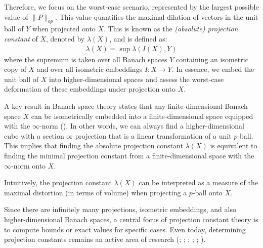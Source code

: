 Therefore, we focus on the worst-case scenario, represented by the largest possible value of $\|P\|_{op}$. This value quantifies the maximal dilation of vectors in the unit ball of $Y$ when projected onto $X$.  This is known as the \emph{(absolute) projection constant} of $X$, denoted by $\lambda(X)$, and is defined as:
\begin{align*}
\lambda(X) = \sup \lambda(I(X), Y)
\end{align*}
where the supremum is taken over all Banach spaces $Y$ containing an isometric copy of $X$ and over all isometric embeddings $I: X \rightarrow Y$. In essence, we embed the unit ball of $X$ into higher-dimensional spaces and assess the worst-case deformation of these embeddings under projection onto $X$.

A key result in Banach space theory states that any finite-dimensional Banach space $X$ can be isometrically embedded into a finite-dimensional space equipped with the $\infty$-norm (\cite{defantProjectionConstantsSpaces2022}). In other words, we can always find a higher-dimensional cube with a section or projection that is a linear transformation of a unit $p$-ball. This implies that finding the absolute projection constant $\lambda(X)$ is equivalent to finding the minimal projection constant from a finite-dimensional space with the $\infty$-norm onto $X$.

Intuitively, the projection constant $\lambda(X)$ can be interpreted as a measure of the maximal distortion (in terms of volume) when projecting a $p$-ball onto $X$.

Since there are infinitely many projections, isometric embeddings, and also higher-dimensional Banach spaces, a central focus of projection constant theory is to compute bounds or exact values for specific cases.  Even today, determining projection constants remains an active area of research (\cite{deregowskaSimpleProofGrunbaum2023}; \cite{defantProjectionConstantsSpaces2022}; \cite{deregowskaValueFifthMaximal2022}; \cite{chalmersMINIMALPROJECTIONSABSOLUTEPROJECTION}; \cite{bassoComputationMaximalProjection2019}; \cite{foucartMaximalRelativeProjection2017}).

